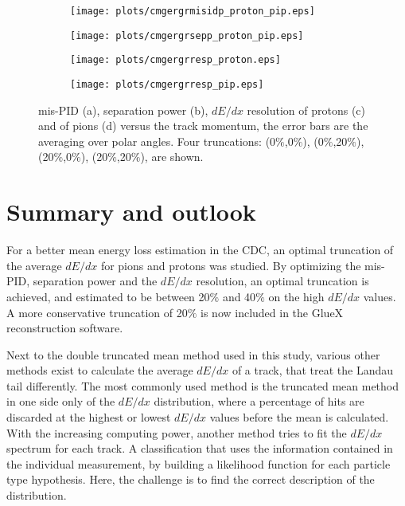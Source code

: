 \begin{figure}[H]
    \centering
    \begin{subfigure}[b]{0.5\textwidth}
        \texttt{[image: plots/cmgergrmisidp\_proton\_pip.eps]}
        \caption{}
        \label{fig.3.8.a} 
    \end{subfigure}\hfill
    \begin{subfigure}[b]{0.5\textwidth}
        \texttt{[image: plots/cmgergrsepp\_proton\_pip.eps]}
        \caption{}
        \label{fig.3.8.b} 
    \end{subfigure}\hfill
    \begin{subfigure}[b]{0.5\textwidth}
        \texttt{[image: plots/cmgergrresp\_proton.eps]}
        \caption{}
        \label{fig.3.8.c} 
    \end{subfigure}\hfill
    \begin{subfigure}[b]{0.5\textwidth}
        \texttt{[image: plots/cmgergrresp\_pip.eps]}
        \caption{}
        \label{fig.3.8.d}
    \end{subfigure}
    \caption{mis-PID (a), separation power (b), $dE/dx$ resolution of protons (c) and of pions (d) versus the track momentum, the error bars are the averaging over polar angles. Four truncations: (0$\%$,0$\%$), (0$\%$,20$\%$),(20$\%$,0$\%$), (20$\%$,20$\%$), are shown.}
    \label{fig.3.8}
\end{figure}

\section{Summary and outlook}
\label{p.3.4}

For a better mean energy loss estimation in the CDC, an optimal truncation of the average $dE/dx$ for pions and protons was studied. By optimizing the mis-PID, separation power and the $dE/dx$ resolution, an optimal truncation is achieved, and estimated to be between 20$\%$ and 40$\%$ on the high $dE/dx$ values. A more conservative truncation of 20$\%$ is now included in the GlueX reconstruction software.
~\par Next to the double truncated mean method used in this study, various other methods exist to calculate the average $dE/dx$ of a track, that treat the Landau tail differently. The most commonly used method is the truncated mean method in one side only of the $dE/dx$ distribution, where a percentage of hits are discarded at the highest or lowest $dE/dx$ values before the mean is calculated. With the increasing computing power, another method tries to fit the $dE/dx$ spectrum for each track. A classification that uses the information contained in the individual measurement, by building a likelihood function for each particle type hypothesis. Here, the challenge is to find the correct description of the distribution.